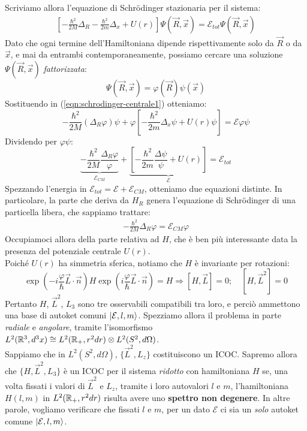\documentclass[../../FisicaTeorica.tex]{subfiles}
\begin{document}
Scriviamo allora l'equazione di Schr\"odinger stazionaria per il sistema:
\begin{align}
\left[-\frac{\hbar^2}{2M}\Delta_R - \frac{\hbar^2}{2m}\Delta_x + U(r)\right]\Psi(\vec{R},\vec{x})=\mathcal{E}_{tot}\Psi(\vec{R},\vec{x})
\label{eqn:schrodinger-centrale1}
\end{align}
Dato che ogni termine dell'Hamiltoniana dipende rispettivamente solo da $\vec{R}$ o da $\vec{x}$, e mai da entrambi contemporaneamente, possiamo cercare una soluzione $\Psi(\vec{R},\vec{x})$ \textit{fattorizzata}:
\[
\Psi(\vec{R},\vec{x})=\varphi(\vec{R})\psi(\vec{x})
\]
Sostituendo in (\ref{eqn:schrodinger-centrale1}) otteniamo:
\[
-\frac{\hbar^2}{2M}(\Delta_R \varphi)\psi +\varphi\left[ -\frac{\hbar^2}{2m}\Delta_x \psi + U(r)\psi\right] = \mathcal{E}\varphi\psi
\]
Dividendo per $\varphi\psi$:
\[
\underbrace{-\frac{\hbar^2}{2M}\frac{\Delta_R \varphi}{\varphi}}_{\mathcal{E}_{CM}}+\underbrace{\left[
-\frac{\hbar^2}{2m} \frac{\Delta\psi}{\psi} + U(r)
\right]}_{\mathcal{E}} = \mathcal{E}_{tot}
\]
Spezzando l'energia in $\mathcal{E}_{tot}=\mathcal{E}+\mathcal{E}_{CM}$, otteniamo due equazioni distinte. In particolare, la parte che deriva da $H_R$ genera l'equazione di Schr\"odinger di una particella libera, che sappiamo trattare:
\begin{align*}
-\frac{\hbar^2}{2M}\Delta_R\varphi = \mathcal{E}_{CM}\varphi
\end{align*}
Occupiamoci allora della parte relativa ad $H$, che è ben più interessante data la presenza del potenziale centrale $U(r)$.\\

Poiché $U(r)$ ha simmetria sferica, notiamo che $H$ è invariante per rotazioni:
\[
\exp\left(-i\frac{\varphi}{\hbar}\vec{L}\cdot\vec{n}\right) H \exp\left(i\frac{\varphi}{\hbar}\vec{L}\cdot \vec{n}\right) = H \Rightarrow [H, \vec{L}]=0; \quad [H,\vec{L}^2]=0
\]
Pertanto $H$, $\vec{L}^2$, $L_3$ sono tre osservabili compatibili tra loro, e perciò ammettono una base di autoket comuni $\Ket{\mathcal{E}, l, m}$. Spezziamo allora il problema in parte \textit{radiale} e \textit{angolare}, tramite l'isomorfismo  $L^2(\mathbb{R}^3,d^3x) \cong L^2(\mathbb{R}_+, r^2 dr) \otimes L^2(S^2, d\Omega)$.\\
Sappiamo che in $L^2(S^2, d\Omega)$, $\{\vec{L}^2, L_z\}$ costituiscono un ICOC. Sapremo allora che $\{H,\vec{L}^2, L_3\}$ è un ICOC per il sistema \textit{ridotto} con hamiltoniana $H$ se, una volta fissati i valori di $\vec{L}^2$ e $L_z$, tramite i loro autovalori $l$ e $m$, l'hamiltoniana $H(l,m)$ in $L^2(\mathbb{R}_+, r^2 dr)$ risulta avere uno \textbf{spettro non degenere}. In altre parole, vogliamo verificare che fissati $l$ e $m$, per un dato $\mathcal{E}$ ci sia un \textit{solo} autoket comune $\Ket{\mathcal{E}, l, m}$.\\
\end{document}

